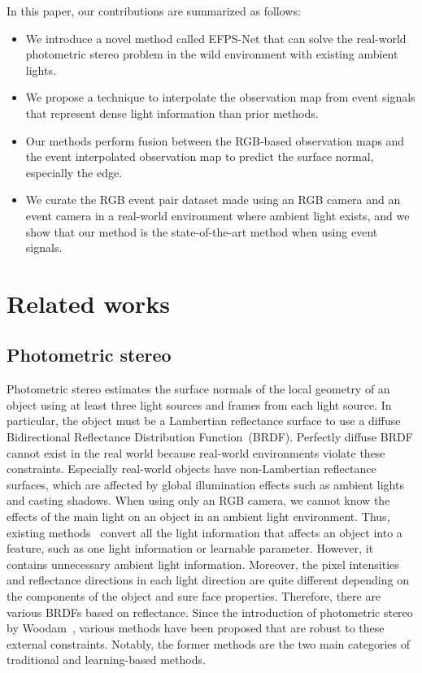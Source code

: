\documentclass[preprint,12pt,authoryear]{elsarticle}
\begin{document}
In this paper, our contributions are summarized as follows:
\begin{itemize}
    \item We introduce a novel method called EFPS-Net that can solve the real-world photometric stereo problem in the wild environment with existing ambient lights. 
    \item We propose a technique to interpolate the observation map from event signals that represent dense light information than prior methods.
    \item Our methods perform fusion between the RGB-based observation maps and the event interpolated observation map to predict the surface normal, especially the edge.
    \item We curate the RGB event pair dataset made using an RGB camera and an event camera in a real-world environment where ambient light exists, and we show that our method is the state-of-the-art method when using event signals.
\end{itemize}

\section{Related works}
\subsection{Photometric stereo}
Photometric stereo estimates the surface normals of the local geometry of an object using at least three light sources and frames from each light source. In particular, the object must be a Lambertian reflectance surface to use a diffuse Bidirectional Reflectance Distribution Function~(BRDF). 
Perfectly diffuse BRDF cannot exist in the real world because real-world environments violate these constraints. Especially real-world objects have non-Lambertian reflectance surfaces, which are affected by global illumination effects such as ambient lights and casting shadows. When using only an RGB camera, we cannot know the effects of the main light on an object in an ambient light environment. Thus, existing methods~\citep{hung2015photometric, hold2019single} convert all the light information that affects an object into a feature, such as one light information or learnable parameter. However, it contains unnecessary ambient light information. Moreover, the pixel intensities and reflectance directions in each light direction are quite different depending on the components of the object and sure
face properties. Therefore, there are various BRDFs based on reflectance. Since the introduction of photometric stereo by Woodam~\citep{woodham1980photometric}, various methods have been proposed that are robust to these external constraints. Notably, the former methods are the two main categories of traditional and learning-based methods.
\end{document}
